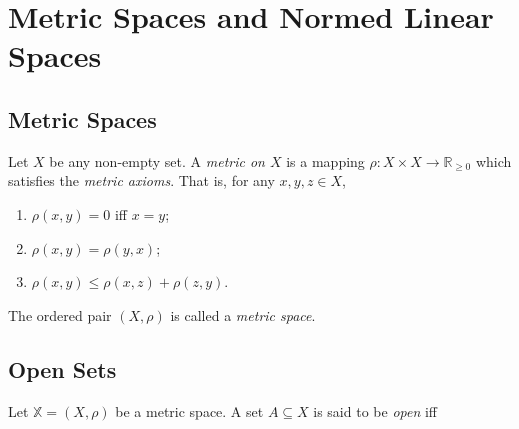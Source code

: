 \chapter{Metric Spaces and Normed Linear Spaces}



\section{Metric Spaces}


\begin{definition}
	\label{def: metric space}
	Let $X$ be any non-empty set. A \textit{metric on $X$} is a mapping $\rho: X  \times X \to \mathbb R_{\ge 0}$ which satisfies the \textit{metric axioms}. That is, for any $x, y, z \in X$,
	\begin{enumerate}[M1.]
		\item
		\label{def: metric space: identity of indiscernibles}
		$\rho(x,y) = 0$ iff $x = y$;
		
		\item
		\label{def: metric space: symmetry}
		$\rho(x,y) = \rho(y, x)$;
		
		\item
		\label{def: triangle inequality}
		$\rho(x,y) \le \rho(x, z) + \rho(z, y)$.
	\end{enumerate}
	
	The ordered pair $(X, \rho)$ is called a \textit{metric space}.
\end{definition}



\section{Open Sets}


\begin{definition}
	Let $\mathbb X = (X, \rho)$ be a metric space. A set $A \subseteq X$ is said to be \textit{open} iff
\end{definition}
